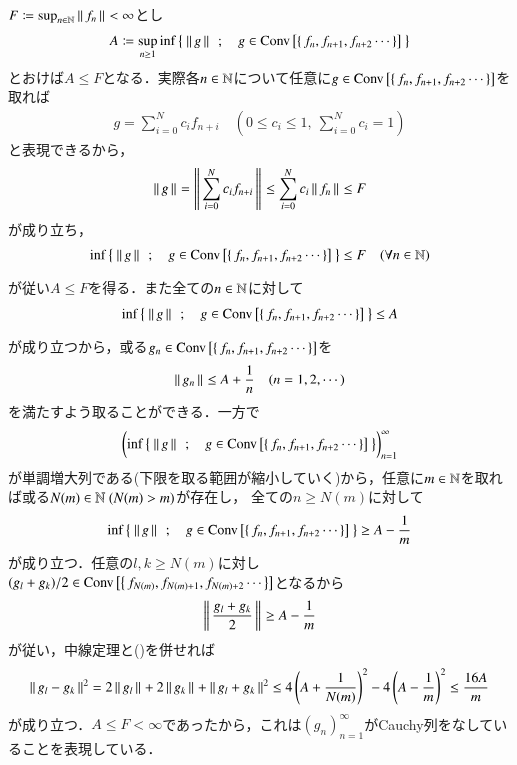 
\begin{prf}
	$F \coloneqq \operatorname*{sup}_{n \in \mathbb{N}} \left\|\, f_n\, \right\|_{} < \infty$とし
	\begin{align}
		A \coloneqq \operatorname*{sup}_{n \geq 1} \operatorname*{inf}_{} \left\{\ \left\|\, g\, \right\|_{}\ \, ; \quad g \in \mathrm{Conv}\left[\left\{\, f_n,f_{n+1},f_{n+2} \cdots \, \right\}\right]\ \right\}
	\end{align}
	とおけば$A \leq F$となる．実際各$n \in \mathbb{N}$について任意に$g \in \mathrm{Conv}\left[\left\{\, f_n,f_{n+1},f_{n+2} \cdots \, \right\}\right]$を取れば
	\begin{align}
		g = \sum_{i=0}^{N}c_i f_{n+i} \quad \left( 0 \leq c_i \leq 1,\ \sum_{i=0}^{N} c_i = 1 \right)
	\end{align}
	と表現できるから，
	\begin{align}
		\left\|\, g\, \right\|_{} = \left\|\, \sum_{i=0}^{N}c_i f_{n+i}\, \right\|_{} \leq \sum_{i=0}^{N}c_i \left\|\, f_n\, \right\|_{} \leq F
	\end{align}
	が成り立ち，
	\begin{align}
		\operatorname*{inf}_{} \left\{\ \left\|\, g\, \right\|_{}\ \, ; \quad g \in \mathrm{Conv}\left[\left\{\, f_n,f_{n+1},f_{n+2} \cdots \, \right\}\right]\ \right\} \leq F \quad (\forall n \in \mathbb{N})
	\end{align}
	が従い$A \leq F$を得る．また全ての$n \in \mathbb{N}$に対して
	\begin{align}
		\operatorname*{inf}_{} \left\{\ \left\|\, g\, \right\|_{}\ \, ; \quad g \in \mathrm{Conv}\left[\left\{\, f_n,f_{n+1},f_{n+2} \cdots \, \right\}\right]\ \right\} \leq A
	\end{align}
	が成り立つから，或る$g_n \in \mathrm{Conv}\left[\left\{\, f_n,f_{n+1},f_{n+2} \cdots \, \right\}\right]$を
	\begin{align}
		\left\|\, g_n\, \right\|_{} \leq A + \frac{1}{n} \quad (n=1,2,\cdots) \label{eq:thm_kolmos_1}
	\end{align}
	を満たすよう取ることができる．一方で
	\begin{align}
		\left( \operatorname*{inf}_{} \left\{\ \left\|\, g\, \right\|_{}\ \, ; \quad g \in \mathrm{Conv}\left[\left\{\, f_n,f_{n+1},f_{n+2} \cdots \, \right\}\right]\ \right\} \right)_{n=1}^\infty
	\end{align}
	が単調増大列である(下限を取る範囲が縮小していく)から，任意に$m \in \mathbb{N}$を取れば或る$N(m) \in \mathbb{N}\ (N(m) > m)$が存在し，
	全ての$n \geq N(m)$に対して
	\begin{align}
		\operatorname*{inf}_{} \left\{\ \left\|\, g\, \right\|_{}\ \, ; \quad g \in \mathrm{Conv}\left[\left\{\, f_n,f_{n+1},f_{n+2} \cdots \, \right\}\right]\ \right\} \geq A - \frac{1}{m}
	\end{align}
	が成り立つ．任意の$l,k \geq N(m)$に対し$(g_l + g_k) / 2 \in \mathrm{Conv}\left[\left\{\, f_{N(m)},f_{N(m)+1},f_{N(m)+2} \cdots \, \right\}\right]$となるから
	\begin{align}
		\left\|\, \frac{g_l + g_k}{2}\, \right\|_{} \geq A - \frac{1}{m}
	\end{align}
	が従い，中線定理と()を併せれば
	\begin{align}
		\left\|\, g_l - g_k\, \right\|_{}^2 = 2\left\|\, g_l\, \right\|_{} + 2\left\|\, g_k\, \right\|_{} + \left\|\, g_l + g_k\, \right\|_{}^2 \leq 4\left( A + \frac{1}{N(m)} \right)^2 - 4\left( A - \frac{1}{m} \right)^2 \leq \frac{16A}{m}
	\end{align}
	が成り立つ．$A \leq F < \infty$であったから，これは$(g_n)_{n=1}^{\infty}$がCauchy列をなしていることを表現している．
	\QED
\end{prf}